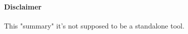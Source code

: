 \documentclass[11pt]{article}
\begin{document}
	\maketitle
	
	\paragraph{Disclaimer} This "summary" it's not supposed to be a standalone tool.
	
	\tableofcontents
	\newpage
	
	
	
	
	
	
	
\end{document}
